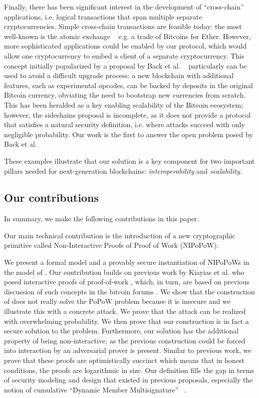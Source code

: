 Finally, there has been significant interest in the development of
``cross-chain'' applications, i.e. logical transactions that span multiple
separate cryptocurrencies. Simple cross-chain transactions are feasible today:
the most well-known is the atomic exchange ~\cite{tiernolan} e.g. a trade of
Bitcoins for Ether. However, more sophisticated applications could be enabled
by our protocol, which would allow one cryptocurrency to embed a client of a
separate cryptocurrency. This concept initially popularized by a proposal by
Back et al. ~\cite{sidechains} particularly can be used to avoid a difficult
upgrade process: a new blockchain with additional features, such as
experimental opcodes, can be backed by deposits in the original Bitcoin
currency, obviating the need to bootstrap new currencies from scratch. This
has been heralded as a key enabling scalability of the Bitcoin ecosystem;
however, the sidechains proposal is incomplete, as it does not provide a
protocol that satisfies a natural security definition, i.e. where attacks
succeed with only negligible probability. Our work is the first to answer the
open problem posed by Back et al.

These examples illustrate that our solution is a key component for two important
pillars needed for next-generation blockchains: \textit{interoperability} and
\textit{scalability}.

\subsection{Our contributions}

In summary, we make the following contributions in this paper.

Our main technical contribution is the introduction of a new cryptographic
primitive called Non-Interactive Proofs of Proof of Work (NIPoPoW).

We present a
formal model and a provably secure instantiation of NIPoPoWs in the model of
\cite{backbone}. Our contribution builds on previous work by Kiayias et al. who
posed interactive proofs of proof-of-work \cite{KLS}, which, in turn, are based
on previous discussion of such concepts in the bitcoin forums \cite{highway}.
We show that the construction of \cite{KLS} does not really solve the PoPoW
problem because it is insecure and we illustrate this with a concrete attack.
We prove that the attack can be realized with overwhelming probability.
We then prove that our construction is in fact a secure solution to the problem.
Furthermore, our solution has the additional property of being non-interactive,
as the previous construction could be forced into interaction by an adversarial
prover is present. Similar to previous work, we prove that these proofs are
optimistically succinct which means that in honest conditions, the proofs are
logarithmic in size. Our definition fills the gap in terms of security modeling
and design that existed in previous proposals, especially the notion of
cumulative ``Dynamic Member Multisignature'' ~\cite{sidechains}.

